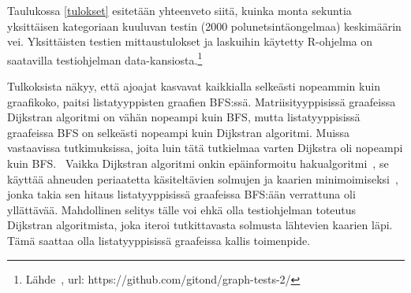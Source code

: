 Taulukossa \ref{tulokset} esitetään yhteenveto siitä, kuinka monta sekuntia 
yksittäisen ka\-te\-goriaan kuuluvan testin (2000 polunetsintäongelmaa) 
keskimäärin vei. Yksittäisten testien mittaustulokset ja laskuihin käytetty 
R-ohjelma on saatavilla testiohjelman 
data-kansiosta.\footnote{Lähde~\cite{gt2}, url: 
https://github.com/gitond/graph-tests-2/} \par
	Tulkoksista näkyy, että ajoajat kasvavat kaikkialla selkeästi 
nopeammin kuin graafikoko, paitsi listatyyppisten graafien BFS:ssä. 
Matriisityyppisissä graafeissa \\ Dijkstran algoritmi on vähän nopeampi kuin 
BFS, mutta listatyyppisissä graafeissa BFS on selkeästi nopeampi kuin 
Dijkstran algoritmi. Muissa vastaavissa tutkimuksissa, joita luin tätä 
tutkielmaa varten Dijkstra oli nopeampi kuin BFS.~\cite{mazeGameTrilogi} 
Vaikka Dijkstran algoritmi onkin epäinformoitu hakualgoritmi~\cite{arXivMAPF}, 
se käyttää ahneuden periaatetta käsiteltävien solmujen ja kaarien 
minimoimiseksi~\cite{mazeGameTrilogi}, jonka takia sen hitaus listatyyppisissä 
graafeissa BFS:ään verrattuna oli yllättävää. Mahdollinen selitys tälle voi 
ehkä olla testiohjelman toteutus Dijkstran algoritmista, joka iteroi 
tutkittavasta solmusta lähtevien kaarien läpi.~\cite{gt2} Tämä saattaa olla 
listatyyppisissä graafeissa kallis toimenpide.
